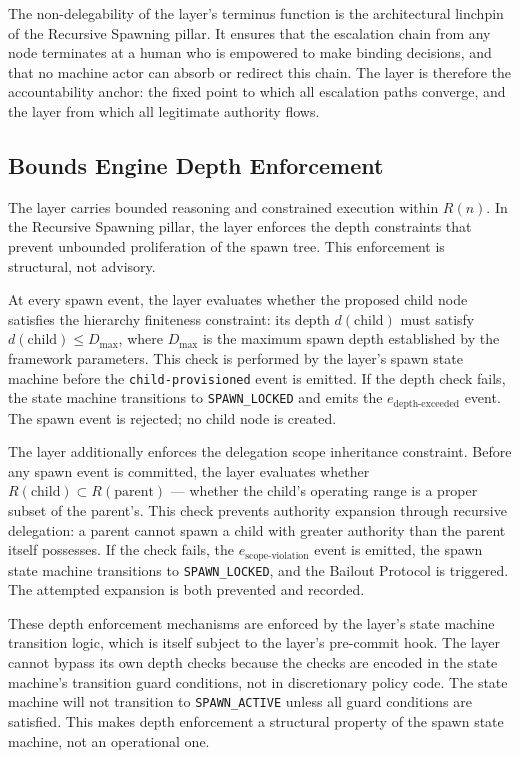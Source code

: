 The non-delegability of the \purpose{} layer's terminus function is the
architectural linchpin of the Recursive Spawning pillar.  It ensures that the
escalation chain from any node terminates at a human who is empowered to make
binding decisions, and that no machine actor can absorb or redirect this chain.
The \purpose{} layer is therefore the accountability anchor: the fixed point
to which all escalation paths converge, and the layer from which all legitimate
authority flows.

\subsection{Bounds Engine Depth Enforcement}
\label{sec:bounds-engine-depth}

The \bounds{} layer carries bounded reasoning and constrained execution within
$R(n)$.  In the Recursive Spawning pillar, the \bounds{} layer enforces the
depth constraints that prevent unbounded proliferation of the spawn tree.  This
enforcement is structural, not advisory.

At every spawn event, the \bounds{} layer evaluates whether the proposed child
node satisfies the hierarchy finiteness constraint: its depth $d(\text{child})$
must satisfy $d(\text{child}) \leq D_{\max}$, where $D_{\max}$ is the maximum
spawn depth established by the framework parameters.  This check is performed by
the \bounds{} layer's spawn state machine before the \texttt{child-provisioned}
event is emitted.  If the depth check fails, the state machine transitions to
\texttt{SPAWN\_LOCKED} and emits the $e_{\text{depth-exceeded}}$ event.  The
spawn event is rejected; no child node is created.

The \bounds{} layer additionally enforces the delegation scope inheritance
constraint.  Before any spawn event is committed, the \bounds{} layer evaluates
whether $R(\text{child}) \subset R(\text{parent})$ — whether the child's
operating range is a proper subset of the parent's.  This check prevents
authority expansion through recursive delegation: a parent cannot spawn a child
with greater authority than the parent itself possesses.  If the check fails, the
$e_{\text{scope-violation}}$ event is emitted, the spawn state machine
transitions to \texttt{SPAWN\_LOCKED}, and the Bailout Protocol is triggered.
The attempted expansion is both prevented and recorded.

These depth enforcement mechanisms are enforced by the \bounds{} layer's state
machine transition logic, which is itself subject to the \fact{} layer's
pre-commit hook.  The \bounds{} layer cannot bypass its own depth checks because
the checks are encoded in the state machine's transition guard conditions, not
in discretionary policy code.  The state machine will not transition to
\texttt{SPAWN\_ACTIVE} unless all guard conditions are satisfied.  This makes
depth enforcement a structural property of the spawn state machine, not an
operational one.

